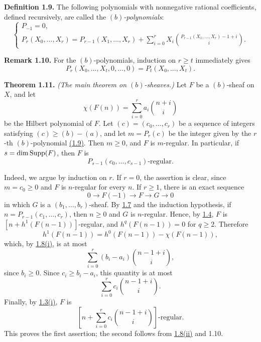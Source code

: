 \textbf{Definition 1.9.} The following polynomials with nonnegative rational
coefficients, defined recursively, are called the \emph{\((b)\)-polynomials}:
\[
\begin{cases}
P_{-1}=0,\\
P_r(X_0,\ldots,X_r)=P_{r-1}(X_1,\ldots,X_r)
+\displaystyle\sum_{i=0}^{r}X_i
\binom{P_{r-1}(X_1,\ldots,X_r)-1+i}{i}.
\end{cases}
\]

\textbf{Remark 1.10.} For the \((b)\)-polynomials, induction on \(r\geq t\)
immediately gives
\[
  P_r(X_0,\ldots,X_t,0,\ldots,0)=P_t(X_0,\ldots,X_t).
\]

\textbf{Theorem 1.11.} \emph{(The main theorem on \((b)\)-sheaves.)} Let
\(F\) be a \((b)\)-sheaf on \(X\), and let
\[
  \chi(F(n))=\sum_{i=0}^{r}a_i\binom{n+i}{i}
\]
be the Hilbert polynomial of \(F\). Let
\((c)=(c_0,\ldots,c_r)\) be a sequence of integers satisfying
\((c)\geq(b)-(a)\), and let \(m=P_r(c)\) be the integer given by the
\(r\)-th \((b)\)-polynomial \hyperlink{sga6.e13.def.1-9}{(1.9)}. Then \(m\geq0\), and \(F\) is
\(m\)-regular. In particular, if \(s=\dim\operatorname{Supp}(F)\), then \(F\) is
\[
  P_{s-1}(c_0,\ldots,c_{s-1})\text{-regular}.
\]

\newpage
Indeed, we argue by induction on \(r\). If \(r=0\), the assertion is clear,
since \(m=c_0\geq0\) and \(F\) is \(n\)-regular for every \(n\). If \(r\geq1\),
there is an exact sequence
\[
  0\longrightarrow F(-1)\longrightarrow F\longrightarrow G\longrightarrow0
\]
in which \(G\) is a \((b_1,\ldots,b_r)\)-sheaf. By \hyperlink{sga6.e13.lem.1-7}{1.7} and the induction
hypothesis, if \(n=P_{r-1}(c_1,\ldots,c_r)\), then \(n\geq0\) and \(G\) is
\(n\)-regular. Hence, by \hyperlink{sga6.e13.prop.1-4}{1.4}, \(F\) is
\([n+h^1(F(n-1))]\)-regular, and \(h^q(F(n-1))=0\) for \(q\geq2\).
Therefore
\[
  h^1(F(n-1))=h^0(F(n-1))-\chi(F(n-1)),
\]
which, by \hyperlink{sga6.e13.prop.1-8}{1.8(i)}, is at most
\[
  \sum_{i=0}^{r}(b_i-a_i)\binom{n-1+i}{i},
\]
since \(b_i\geq0\).
Since \(c_i\geq b_i-a_i\), this quantity is at most
\[
  \sum_{i=0}^{r}c_i\binom{n-1+i}{i}.
\]
Finally, by \hyperlink{sga6.e13.prop.1-3}{1.3(i)}, \(F\) is
\[
  \left[n+\sum_{i=0}^{r}c_i\binom{n-1+i}{i}\right]\text{-regular}.
\]
This proves the first assertion; the second follows from \hyperlink{sga6.e13.prop.1-8}{1.8(ii)} and 1.10.

